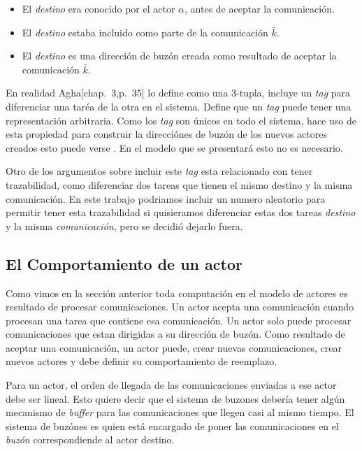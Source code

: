 \begin{itemize}
 \item El \textit{destino} era conocido por el actor $\alpha$, antes de aceptar la comunicación.
 \item El \textit{destino} estaba incluido como parte de la comunicación $\bar{k}$.
 \item El \textit{destino} es una dirección de buzón creada como resultado de aceptar la comunicación $\bar{k}$.
\end{itemize}

En realidad Agha[chap.~3,p.~35]\cite{Agha:1986:AMC:7929} lo define como una 3-tupla, incluye un \textit{tag} para diferenciar una taréa de la otra en el sistema. Define que un \textit{tag} puede tener una representación arbitraria. Como los \textit{tag} son únicos en todo el sistema, hace uso de esta propiedad para construir la direcciónes de buzón de los nuevos actores creados esto puede verse \cite[chap.~5,p.~104]{Agha:1986:AMC:7929}. En el modelo que se presentará esto no es necesario.

Otro de los argumentos sobre incluir este \textit{tag} esta relacionado con tener trazabilidad, como diferenciar dos tareas que tienen el mismo destino y la misma comunicación. En este trabajo podriamos incluir un numero aleatorio para permitir tener esta trazabilidad si quisieramos diferenciar estas dos tareas \textit{destino} y la misma \textit{comunicación}, pero se decidió dejarlo fuera.

\subsection{El Comportamiento de un actor}

Como vimos en la sección anterior toda computación en el modelo de actores es resultado de procesar comunicaciones. Un actor acepta una comunicación cuando procesan una tarea que contiene esa comunicación. Un actor solo puede procesar comunicaciones que estan dirigidas a su dirección de buzón. Como resultado de aceptar una comunicación, un actor puede, crear nuevas comunicaciones, crear nuevos actores y debe definir su comportamiento de reemplazo.

Para un actor, el orden de llegada de las comunicaciones enviadas a ese actor debe ser lineal. Esto quiere decir que el sistema de buzones debería tener algún mecanismo de \textit{buffer} para las comunicaciones que llegen casi al mismo tiempo. El sistema de buzónes es quien está encargado de poner las comunicaciones en el \textit{buzón} correspondiende al actor destino. 

